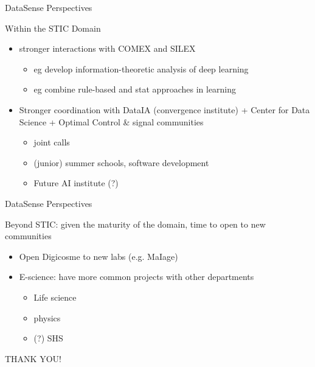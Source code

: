 \begin{frame}{DataSense Perspectives}

Within the STIC Domain

\begin{itemize}
\item stronger interactions with COMEX and SILEX
  \begin{itemize}
  \item eg develop information-theoretic analysis of deep learning
  \item eg combine rule-based and stat approaches in learning
  \end{itemize}
\item Stronger coordination with DataIA (convergence institute) + Center for Data Science + Optimal Control \& signal communities
  \begin{itemize}
  \item joint calls
  \item (junior) summer schools, software development
  \item Future AI institute (?)
  \end{itemize}
\end{itemize}


\end{frame}


\begin{frame}{DataSense Perspectives}

Beyond STIC: given the maturity of the domain, time to open to new communities

\begin{itemize}
\item Open Digicosme to new labs (e.g. MaIage)
\item E-science: have more common projects with  other departments
  \begin{itemize}
  \item Life science
  \item physics
  \item (?) SHS
  \end{itemize}
\end{itemize}

\end{frame}

\begin{frame}[plain]{}

  \vfill
  \begin{center}
    \huge THANK YOU!
  \end{center}
  \vfill

\end{frame}

